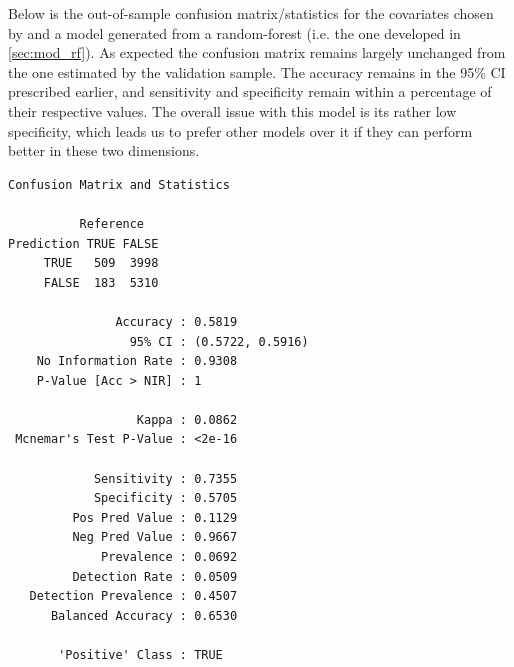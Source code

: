 \documentclass[11pt, fleqn]{article}
\begin{document}
Below is the out-of-sample confusion matrix/statistics for the covariates chosen by and a model generated from a random-forest (i.e. the one developed in \cref{sec:mod_rf}).  As expected the confusion matrix remains largely unchanged from the one estimated by the validation sample.  The accuracy remains in the 95\% CI prescribed earlier, and sensitivity and specificity remain within a percentage of their respective values.  The overall issue with this model is its rather low specificity, which leads us to prefer other models over it if they can perform better in these two dimensions.

\begin{verbatim}
Confusion Matrix and Statistics

          Reference
Prediction TRUE FALSE
     TRUE   509  3998
     FALSE  183  5310
                                          
               Accuracy : 0.5819          
                 95% CI : (0.5722, 0.5916)
    No Information Rate : 0.9308          
    P-Value [Acc > NIR] : 1               
                                          
                  Kappa : 0.0862          
 Mcnemar's Test P-Value : <2e-16          
                                          
            Sensitivity : 0.7355          
            Specificity : 0.5705          
         Pos Pred Value : 0.1129          
         Neg Pred Value : 0.9667          
             Prevalence : 0.0692          
         Detection Rate : 0.0509          
   Detection Prevalence : 0.4507          
      Balanced Accuracy : 0.6530          
                                          
       'Positive' Class : TRUE
\end{verbatim}
\end{document}
